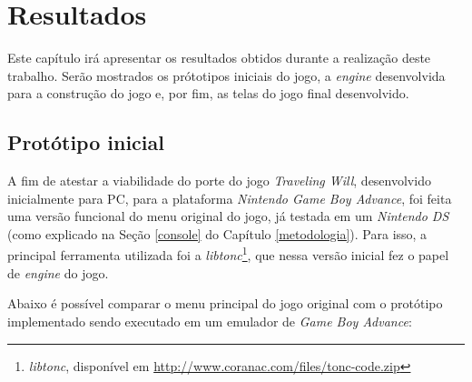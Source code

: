 \chapter[Resultados]{Resultados}

Este capítulo irá apresentar os resultados obtidos durante a realização deste trabalho. Serão mostrados os prótotipos iniciais do jogo, a \textit{engine} desenvolvida para a construção do jogo e, por fim, as telas do jogo final desenvolvido.

\section{Protótipo inicial}

A fim de atestar a viabilidade do porte do jogo \textit{Traveling Will}, desenvolvido inicialmente para PC, para a plataforma \textit{Nintendo Game Boy Advance}, foi feita uma versão funcional do menu original do jogo, já testada em um \textit{Nintendo DS} (como explicado na Seção \ref{console} do Capítulo \ref{metodologia}). Para isso, a principal ferramenta utilizada foi a \textit{libtonc}\footnote{\textit{libtonc}, disponível em \url{http://www.coranac.com/files/tonc-code.zip}}, que nessa versão inicial fez o papel de \textit{engine} do jogo.

Abaixo é possível comparar o menu principal do jogo original com o protótipo implementado sendo executado em um emulador de \textit{Game Boy Advance}:


